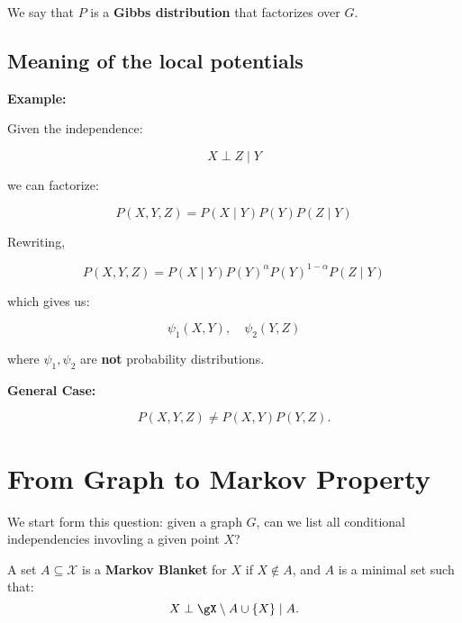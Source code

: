 \documentclass{article}%
\begin{document}
We say that \( P \) is a \textbf{Gibbs distribution} that factorizes over \( G \).

\subsection{Meaning of the local potentials}

\textbf{Example:}

\begin{center}
\end{center}

Given the independence:

\[
X \perp Z \mid Y
\]

we can factorize:

\[
P(X, Y, Z) = P(X \mid Y) P(Y) P(Z \mid Y)
\]

Rewriting,

\[
P(X, Y, Z) = P(X\mid Y) P(Y)^\alpha P(Y)^{1-\alpha} P(Z \mid Y)
\]

which gives us:

\[
\psi_1 (X,Y), \quad \psi_2 (Y,Z)
\]

where \( \psi_1, \psi_2 \) are \textbf{not} probability distributions.

\textbf{General Case:} 

\[
P(X, Y, Z) \neq P(X, Y) P(Y, Z).
\]

\section{From Graph to Markov Property}
We start form this question: given a graph \( G \), can we list all conditional independencies invovling a given point $X$?

\begin{definition}
A set \( A \subseteq \mathcal{X} \) is a \textbf{Markov Blanket} for \( X \) if \( X \not\in A \), and \( A \) is a minimal set such that:
\[
X \perp \gX \setminus A \cup \{X\} \mid A.
\]
\end{definition}
\end{document}
